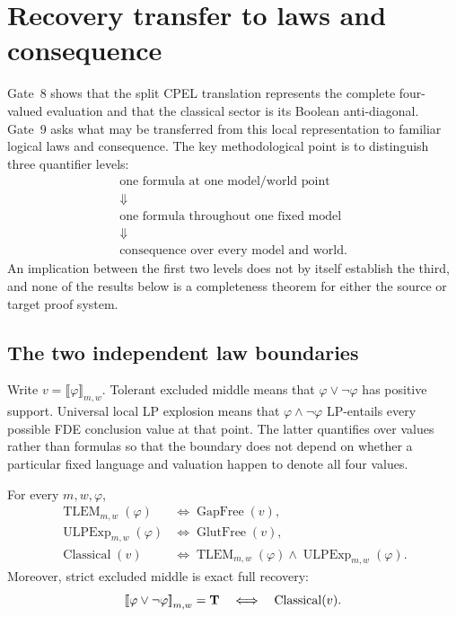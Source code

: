\section{Recovery transfer to laws and consequence}
\label{sec:recovery-consequence-transfer}

Gate~8 shows that the split CPEL translation represents the complete four-valued
evaluation and that the classical sector is its Boolean anti-diagonal. Gate~9 asks
what may be transferred from this local representation to familiar logical laws and
consequence. The key methodological point is to distinguish three quantifier levels:
\[
\begin{array}{c}
\text{one formula at one model/world point}\\[2pt]
\Downarrow\\[2pt]
\text{one formula throughout one fixed model}\\[2pt]
\Downarrow\\[2pt]
\text{consequence over every model and world.}
\end{array}
\]
An implication between the first two levels does not by itself establish the third,
and none of the results below is a completeness theorem for either the source or
target proof system.

\subsection{The two independent law boundaries}

Write \(v=\llbracket\varphi\rrbracket_{m,w}\). Tolerant excluded middle means that
\(\varphi\lor\neg\varphi\) has positive support. Universal local LP explosion means
that \(\varphi\land\neg\varphi\) LP-entails every possible FDE conclusion value at
that point. The latter quantifies over values rather than formulas so that the
boundary does not depend on whether a particular fixed language and valuation happen
to denote all four values.

\begin{theorem}
\label{thm:gate9-local-laws}
For every \(m,w,\varphi\),
\[
\boxed{
\begin{aligned}
\operatorname{TLEM}_{m,w}(\varphi)
&\Longleftrightarrow \operatorname{GapFree}(v),\\
\operatorname{ULPExp}_{m,w}(\varphi)
&\Longleftrightarrow \operatorname{GlutFree}(v),\\
\operatorname{Classical}(v)
&\Longleftrightarrow
\operatorname{TLEM}_{m,w}(\varphi)
\land
\operatorname{ULPExp}_{m,w}(\varphi).
\end{aligned}
}
\]
Moreover, strict excluded middle is exact full recovery:
\[
\mathopen{[\![}\varphi\lor\neg\varphi\mathclose{]\!]}_{m,w}=\mathbf{T}
\quad\Longleftrightarrow\quad
\operatorname{Classical}(v).
\]
\statusverified
\end{theorem}

